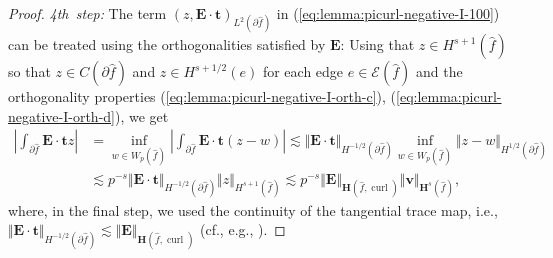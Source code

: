 \documentclass{article}
\begin{document}
\begin{proof}
\emph{4th~step:} The term $(z,{\mathbf{E}}\cdot{\mathbf{t}})_{L^{2}(\partial
\widehat{f})}$ in (\ref{eq:lemma:picurl-negative-I-100}) 
can be treated using the orthogonalities satisfied by ${\mathbf{E}}$:
Using that $z\in H^{s+1}(\widehat{f})$ so that $z\in C(\partial \widehat{f})$ and $z\in H^{s+1/2}(e)$
for each edge $e\in{\mathcal{E}}(\widehat{f})$ and the orthogonality properties
(\ref{eq:lemma:picurl-negative-I-orth-c}), 
(\ref{eq:lemma:picurl-negative-I-orth-d}), we get
\begin{align*}
\left\vert \int_{\partial \widehat{f}}{\mathbf{E}}\cdot{\mathbf{t}}z\right\vert  &
\!=\!\!\inf_{w\in W_{p}(\widehat{f})}\!\left\vert \int_{\partial\widehat{f}}{\mathbf{E}}%
\cdot{\mathbf{t}}(z-w)\right\vert \lesssim\Vert{\mathbf{E}}\cdot{\mathbf{t}%
}\Vert_{H^{-1/2}(\partial \widehat{f})}\!\inf_{w\in W_{p}(\widehat{f})}\!\Vert z-w\Vert
_{H^{1/2}(\partial \widehat{f})}\\
&  \lesssim p^{-s}\Vert{\mathbf{E}}\cdot{\mathbf{t}}\Vert_{H^{-1/2}(\partial
\widehat{f})}\Vert z\Vert_{H^{s+1}(\widehat{f})}\lesssim p^{-s}\Vert{\mathbf{E}}\Vert
_{\mathbf{H}(\widehat{f},\operatorname{curl})}\Vert \mathbf{v}\Vert_{\mathbf{H}^{s}(\widehat{f})},
\end{align*}
where, in the final step, we used the continuity of the tangential trace map, 
i.e., 
$\Vert{\mathbf{E}}\cdot{\mathbf{t}}\Vert_{H^{-1/2}(\partial \widehat{f})}\lesssim
\Vert{\mathbf{E}}\Vert_{\mathbf{H}(\widehat{f},\operatorname{curl})}$ 
(cf., e.g.,  \cite[{eq. (154)}]{demkowicz08}). 


\end{proof}
\end{document}
